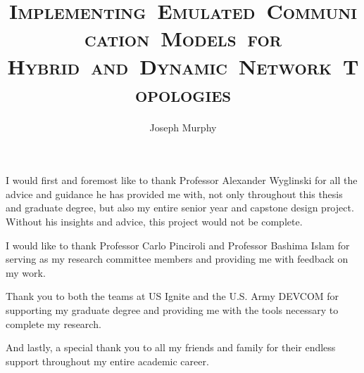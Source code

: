 \documentclass[11pt]{mvlthesis}
\title{\scshape \mbox{Implementing Emulated Communication Models for}\\
\scshape \mbox{Hybrid and Dynamic Network Topologies}}
\author{Joseph Murphy}
\begin{document}
\maketitle
\begin{abstract}



\end{abstract}

\begin{frontmatter}
\begin{acknowledgements}
\begin{center}
\vspace{0.4in}
I would first and foremost like to thank Professor Alexander Wyglinski for all the advice and guidance he has provided me with, not only throughout this thesis and graduate degree, but also my entire senior year and capstone design project. Without his insights and advice, this project would not be complete. \par
I would like to thank Professor Carlo Pinciroli and Professor Bashima Islam for serving as my research committee members and providing me with feedback on my work. \par
Thank you to both the teams at US Ignite and the U.S. Army DEVCOM for supporting my graduate degree and providing me with the tools necessary to complete my research. \par
And lastly, a special thank you to all my friends and family for their endless support throughout my entire academic career.
\end{center}
\end{acknowledgements}

\tableofcontents
\listoffigures
\listoftables

\end{frontmatter}











\appendix
\end{document}
